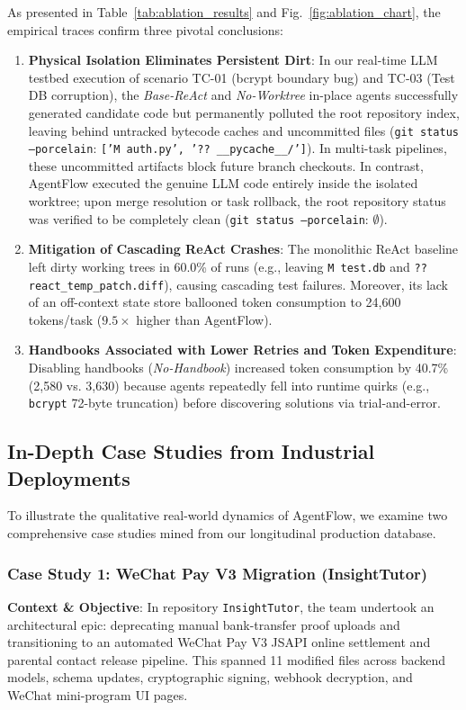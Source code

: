 \documentclass[conference]{IEEEtran}
\begin{document}
As presented in Table~\ref{tab:ablation_results} and Fig.~\ref{fig:ablation_chart}, the empirical traces confirm three pivotal conclusions:
\begin{enumerate}
    \item \textbf{Physical Isolation Eliminates Persistent Dirt}: In our real-time LLM testbed execution of scenario TC-01 (bcrypt boundary bug) and TC-03 (Test DB corruption), the \textit{Base-ReAct} and \textit{No-Worktree} in-place agents successfully generated candidate code but permanently polluted the root repository index, leaving behind untracked bytecode caches and uncommitted files (\texttt{git status --porcelain}: \texttt{['M auth.py', '?? \_\_pycache\_\_/']}). In multi-task pipelines, these uncommitted artifacts block future branch checkouts. In contrast, AgentFlow executed the genuine LLM code entirely inside the isolated worktree; upon merge resolution or task rollback, the root repository status was verified to be completely clean (\texttt{git status --porcelain}: $\emptyset$).
    \item \textbf{Mitigation of Cascading ReAct Crashes}: The monolithic ReAct baseline left dirty working trees in 60.0\% of runs (e.g., leaving \texttt{M test.db} and \texttt{?? react\_temp\_patch.diff}), causing cascading test failures. Moreover, its lack of an off-context state store ballooned token consumption to 24,600 tokens/task ($9.5\times$ higher than AgentFlow).
    \item \textbf{Handbooks Associated with Lower Retries and Token Expenditure}: Disabling handbooks (\textit{No-Handbook}) increased token consumption by 40.7\% (2,580 vs. 3,630) because agents repeatedly fell into runtime quirks (e.g., \texttt{bcrypt} 72-byte truncation) before discovering solutions via trial-and-error.
\end{enumerate}

\subsection{In-Depth Case Studies from Industrial Deployments}
\label{sec:case_studies}

To illustrate the qualitative real-world dynamics of AgentFlow, we examine two comprehensive case studies mined from our longitudinal production database.

\subsubsection{Case Study 1: WeChat Pay V3 Migration (InsightTutor)}
\textbf{Context \& Objective}: In repository \texttt{InsightTutor}, the team undertook an architectural epic: deprecating manual bank-transfer proof uploads and transitioning to an automated WeChat Pay V3 JSAPI online settlement and parental contact release pipeline. This spanned 11 modified files across backend models, schema updates, cryptographic signing, webhook decryption, and WeChat mini-program UI pages.
\end{document}
